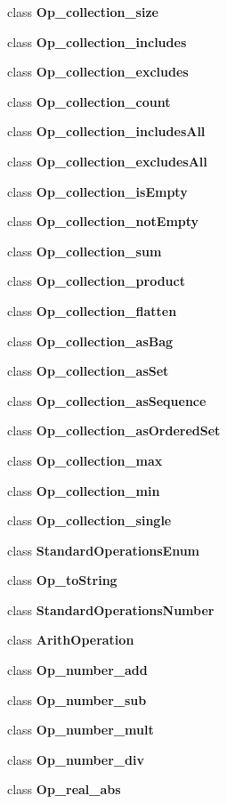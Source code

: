 \begin{DoxyCompactItemize}
\item 
class {\bfseries Op\-\_\-collection\-\_\-size}
\item 
class {\bfseries Op\-\_\-collection\-\_\-includes}
\item 
class {\bfseries Op\-\_\-collection\-\_\-excludes}
\item 
class {\bfseries Op\-\_\-collection\-\_\-count}
\item 
class {\bfseries Op\-\_\-collection\-\_\-includes\-All}
\item 
class {\bfseries Op\-\_\-collection\-\_\-excludes\-All}
\item 
class {\bfseries Op\-\_\-collection\-\_\-is\-Empty}
\item 
class {\bfseries Op\-\_\-collection\-\_\-not\-Empty}
\item 
class {\bfseries Op\-\_\-collection\-\_\-sum}
\item 
class {\bfseries Op\-\_\-collection\-\_\-product}
\item 
class {\bfseries Op\-\_\-collection\-\_\-flatten}
\item 
class {\bfseries Op\-\_\-collection\-\_\-as\-Bag}
\item 
class {\bfseries Op\-\_\-collection\-\_\-as\-Set}
\item 
class {\bfseries Op\-\_\-collection\-\_\-as\-Sequence}
\item 
class {\bfseries Op\-\_\-collection\-\_\-as\-Ordered\-Set}
\item 
class {\bfseries Op\-\_\-collection\-\_\-max}
\item 
class {\bfseries Op\-\_\-collection\-\_\-min}
\item 
class {\bfseries Op\-\_\-collection\-\_\-single}
\item 
class {\bfseries Standard\-Operations\-Enum}
\item 
class {\bfseries Op\-\_\-to\-String}
\item 
class {\bfseries Standard\-Operations\-Number}
\item 
class {\bfseries Arith\-Operation}
\item 
class {\bfseries Op\-\_\-number\-\_\-add}
\item 
class {\bfseries Op\-\_\-number\-\_\-sub}
\item 
class {\bfseries Op\-\_\-number\-\_\-mult}
\item 
class {\bfseries Op\-\_\-number\-\_\-div}
\item 
class {\bfseries Op\-\_\-real\-\_\-abs}
\item 

\end{DoxyCompactItemize}
